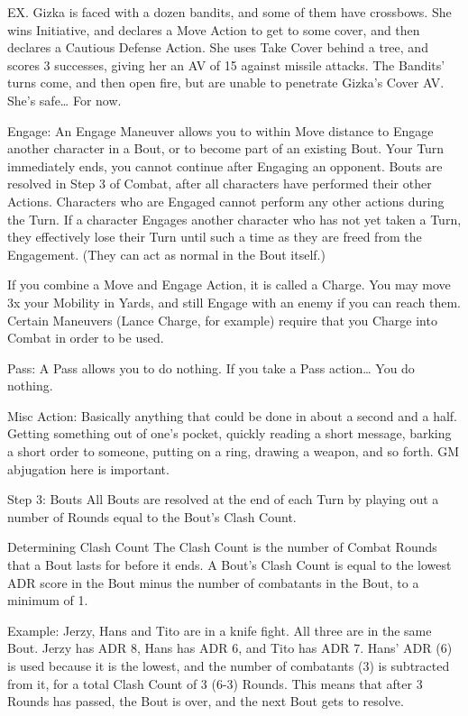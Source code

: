 \documentclass[oneside,11pt,english]{book}
\begin{document}
 

EX. Gizka is faced with a dozen bandits, and some of them have crossbows. She wins 
Initiative, and declares a Move Action to get to some cover, and then declares a Cautious 
Defense Action. She uses Take Cover behind a tree, and scores 3 successes, giving her an 
AV of 15 against missile attacks. The Bandits’ turns come, and then open fire, but are 
unable to penetrate Gizka’s Cover AV. She’s safe… For now. 

 

Engage: An Engage Maneuver allows you to within Move distance to Engage another character 
in a Bout, or to become part of an existing Bout. Your Turn immediately ends, you cannot 
continue after Engaging an opponent. Bouts are resolved in Step 3 of Combat, after all characters 
have performed their other Actions. 
Characters who are Engaged cannot perform any other actions during the Turn. If a character 
Engages another character who has not yet taken a Turn, they effectively lose their Turn until 
such a time as they are freed from the Engagement. (They can act as normal in the Bout itself.) 

 

If you combine a Move and Engage Action, it is called a Charge. You may move 3x your 
Mobility in Yards, and still Engage with an enemy if you can reach them. Certain Maneuvers 
(Lance Charge, for example) require that you Charge into Combat in order to be used. 

 

Pass: A Pass allows you to do nothing. If you take a Pass action… You do nothing. 

 

Misc Action: Basically anything that could be done in about a second and a half. Getting 
something out of one's pocket, quickly reading a short message, barking a short order to 
someone, putting on a ring, drawing a weapon, and so forth. GM abjugation here is important. 

 

Step 3: Bouts 
All Bouts are resolved at the end of each Turn by playing out a number of Rounds equal to the 
Bout’s Clash Count. 

 

Determining Clash Count 
The Clash Count is the number of Combat Rounds that a Bout lasts for before it ends. A 
Bout’s Clash Count is equal to the lowest ADR score in the Bout minus the number of 
combatants in the Bout, to a minimum of 1. 


Example: Jerzy, Hans and Tito are in a knife fight. All three are in the same Bout. Jerzy 
has ADR 8, Hans has ADR 6, and Tito has ADR 7. Hans’ ADR (6) is used because it is 
the lowest, and the number of combatants (3) is subtracted from it, for a total Clash 
Count of 3 (6-3) Rounds. This means that after 3 Rounds has passed, the Bout is over, 
and the next Bout gets to resolve. 
\end{document}
